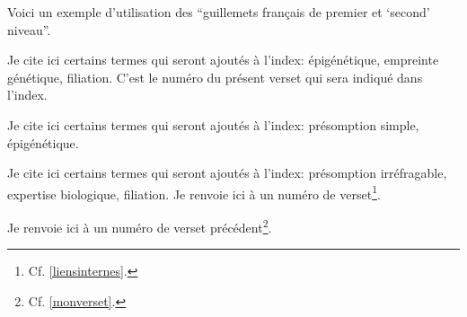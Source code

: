 Voici un exemple d'utilisation des \enquote{guillemets français de premier et \enquote{second} niveau}.

Je cite ici certains termes qui seront ajoutés à l'index: épigénétique, empreinte génétique, filiation. C'est le numéro du présent verset qui sera indiqué dans l'index.

Je cite ici certains termes qui seront ajoutés à l'index: présomption simple, épigénétique.

Je cite ici certains termes qui seront ajoutés à l'index: présomption irréfragable, expertise biologique, filiation.
\newpage
{}
\label{monverset}
Je renvoie ici à un numéro de verset\footnote{Cf. \vref{liensinternes}.}.

\label{monverset2}
Je renvoie ici à un numéro de verset précédent\footnote{Cf. \vref{monverset}.}.



